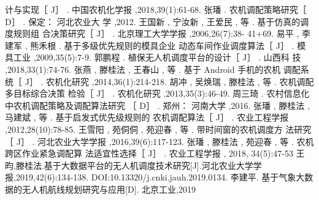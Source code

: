 \documentclass[UTF8,a4paper,10pt,nocolorlinks]{ctexart}
\begin{document}
\begin{thebibliography}{99}
计与实现［ J］ . 中国农机化学报 ,2018,39(1):61-68.
 张璠 . 农机调配策略研究［ D］ . 保定： 河北农业大
学 ,2012.
 王国新 , 宁汝新 , 王爱民 , 等 . 基于仿真的调度规则组
合决策研究［ J］ . 北京理工大学学报 ,2006,26(7):38-
41+69.
 易平 , 李建军 , 熊禾根 . 基于多级优先规则的模具企业
动态车间作业调度算法［ J］ . 模具工业 ,2009,35(5):7-9.
 郭鹏程 . 植保无人机调度平台的设计［ J］ . 山西科
技 ,2018,33(1):74-76.
 张燕 , 滕桂法 , 王春山 , 等 . 基于 Android 手机的农机
调配系统［ J］ . 农机化研究 ,2014,36(1):214-218.
 胡冲 , 吴焕瑞 , 滕桂法 , 等 . 农机调配多目标综合决策
检验［ J］ . 农机化研究 ,2013,35(3):46-49.
 周三琦 . 农村信息化中农机调配策略及调配算法研究
［ D］ . 郑州： 河南大学 ,2016.
 张璠 , 滕桂法 , 马建斌 , 等 . 基于启发式优先级规则的
农机调配算法［ J］ . 农业工程学报 ,2012,28(10):78-85.
 王雪阳 , 苑侗侗 , 苑迎春 , 等 . 带时间窗的农机调度方
法研究［ J］ . 河北农业大学学报 ,2016,39(6):117-123.
 张璠 , 滕桂法 , 苑迎春 , 等 . 农机跨区作业紧急调配算
法适宜性选择［ J］ . 农业工程学报 , 2018, 34(5):47-53
 王昀,滕桂法.基于大数据平台的无人机调度技术研究[J].河北农业大学学报,2019,42(6):134-138. DOI:10.13320/j.cnki.jauh.2019.0134.
李建平. 基于气象大数据的无人机航线规划研究与应用[D]. 北京工业,2019
\end{thebibliography}  
\end{document}
